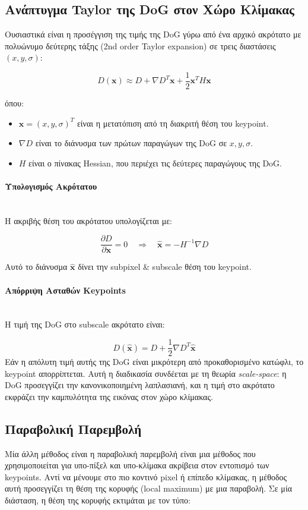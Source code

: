 \documentclass[12pt]{article}
\begin{document}
\subsection{Ανάπτυγμα Taylor της DoG στον Χώρο Κλίμακας}
Ουσιαστικά είναι η προσέγγιση της τιμής της DoG γύρω από ένα αρχικό ακρότατο με πολυώνυμο δεύτερης τάξης (2nd order Taylor expansion)
σε τρεις διαστάσεις $(x,y,\sigma)$:

\[
D(\mathbf{x}) \approx D + \nabla D^T \mathbf{x} + \frac{1}{2} \mathbf{x}^T H \mathbf{x}
\]

όπου:

\begin{itemize}
    \item $\mathbf{x} = (x,y,\sigma)^T$ είναι η μετατόπιση από τη διακριτή θέση του keypoint.
    \item $\nabla D$ είναι το διάνυσμα των πρώτων παραγώγων της DoG σε $x, y, \sigma$.
    \item $H$ είναι ο πίνακας Hessian, που περιέχει τις δεύτερες παραγώγους της DoG.
\end{itemize}


\paragraph{Υπολογισμός Ακρότατου}
\mbox{}\\

Η ακριβής θέση του ακρότατου υπολογίζεται με:

\[
\frac{\partial D}{\partial \mathbf{x}} = 0 \quad \Rightarrow \quad \hat{\mathbf{x}} = - H^{-1} \nabla D
\]

Αυτό το διάνυσμα $\hat{\mathbf{x}}$ δίνει την subpixel \& subscale θέση του keypoint.

\paragraph{Απόρριψη Ασταθών Keypoints}
\mbox{}\\

Η τιμή της DoG στο subscale ακρότατο είναι:

\[
D(\hat{\mathbf{x}}) = D + \frac{1}{2} \nabla D^T \hat{\mathbf{x}}
\]
Εάν η απόλυτη τιμή αυτής της DoG είναι μικρότερη από προκαθορισμένο κατώφλι, το keypoint απορρίπτεται. 
Αυτή η διαδικασία συνδέεται με τη θεωρία \textit{scale-space}: η DoG προσεγγίζει την κανονικοποιημένη λαπλασιανή, και η τιμή στο ακρότατο εκφράζει την καμπυλότητα της εικόνας στον χώρο κλίμακας.

\subsection{Παραβολική Παρεμβολή}
Μία άλλη μέθοδος είναι η παραβολική παρεμβολή είναι μια μέθοδος που χρησιμοποιείται για υπο-πίξελ και υπο-κλίμακα ακρίβεια στον εντοπισμό των keypoints.
Αντί να μένουμε στο πιο κοντινό pixel ή επίπεδο κλίμακας, η μέθοδος αυτή προσεγγίζει τη θέση της κορυφής (local maximum) με μια παραβολή.
Σε μία διάσταση, η θέση της κορυφής εκτιμάται με τον τύπο:
\end{document}
